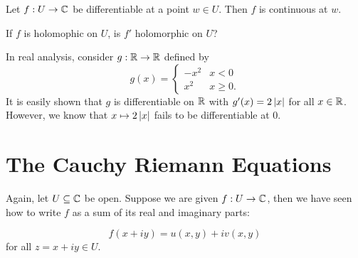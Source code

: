 

\begin{proposition}
\label{p:diffimpliescontinuous}
Let $f: U \to \mathbb{C}$ be differentiable at a point $w \in U$.  Then $f$ is continuous at $w$.
\end{proposition}


\begin{example}
If $f$ is holomophic on $U$, is $f'$ holomorphic on $U$?
\end{example}
\begin{example}
In real analysis, consider $g:\mathbb{R} \to \mathbb{R}$ defined by
\[
g(x) = \begin{cases}
-x^2 & x<0 \\
x^2 & x\geq 0.
\end{cases}
\]
It is easily shown that $g$ is differentiable on $\mathbb{R}$ with $g'(x) = 2 \left| x \right|$ for all $x \in \mathbb{R}$.  However, we know that $x \mapsto 2 \left| x \right|$ fails to be differentiable at $0$.
\end{example}

\section{The Cauchy Riemann Equations}
Again, let $U \subseteq \mathbb{C}$ be open.  Suppose we are given $f:U \to \mathbb{C}$, then we have seen how to write $f$ as a sum of its real and imaginary parts:


\[ f(x+iy)=u(x,y)+iv(x,y) \]
for all $z=x+iy \in U$.  \

